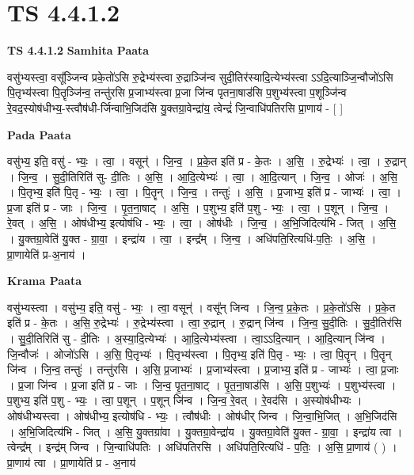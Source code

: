 \documentclass[17pt]{extarticle}
\begin{document}
\section{ TS 4.4.1.2 }

\textbf{TS 4.4.1.2 } \newline
\textbf{Samhita Paata} \newline

वसु॑भ्यस्त्वा॒ वसू᳚ञ्जिन्व प्रके॒तो॑ऽसि रु॒द्रेभ्य॑स्त्वा रु॒द्राञ्जि॑न्व सुदी॒तिर॑स्यादि॒त्येभ्य॑स्त्वा ऽऽदि॒त्याञ्जि॒न्वौजो॑ऽसि पि॒तृभ्य॑स्त्वा पि॒तॄञ्जि॑न्व॒ तन्तु॑रसि प्र॒जाभ्य॑स्त्वा प्र॒जा जि॑न्व पृतना॒षाड॑सि प॒शुभ्य॑स्त्वा प॒शूञ्जि॑न्व रे॒वद॒स्योष॑धीभ्य॒-स्त्वौष॑धी-र्जिन्वाभि॒जिद॑सि यु॒क्तग्रा॒वेन्द्रा॑य॒ त्वेन्द्रं॑ जि॒न्वाधि॑पतिरसि प्रा॒णाय॑ - [  ] \newline

\textbf{Pada Paata} \newline

वसु॑भ्य॒ इति॒ वसु॑ - भ्यः॒ । त्वा॒ । वसून्॑ । जि॒न्व॒ । प्र॒के॒त इति॑ प्र - के॒तः । अ॒सि॒ । रु॒द्रेभ्यः॑ । त्वा॒ । रु॒द्रान् । जि॒न्व॒ । सु॒दी॒तिरिति॑ सु- दी॒तिः । अ॒सि॒ । आ॒दि॒त्येभ्यः॑ । त्वा॒ । आ॒दि॒त्यान् । जि॒न्व॒ । ओजः॑ । अ॒सि॒ । पि॒तृभ्य॒ इति॑ पि॒तृ - भ्यः॒ । त्वा॒ । पि॒तॄन् । जि॒न्व॒ । तन्तुः॑ । अ॒सि॒ । प्र॒जाभ्य॒ इति॑ प्र - जाभ्यः॑ । त्वा॒ । प्र॒जा इति॑ प्र - जाः । जि॒न्व॒ । पृ॒त॒ना॒षाट् । अ॒सि॒ । प॒शुभ्य॒ इति॑ प॒शु - भ्यः॒ । त्वा॒ । प॒शून् । जि॒न्व॒ । रे॒वत् । अ॒सि॒ । ओष॑धीभ्य॒ इत्योष॑धि - भ्यः॒ । त्वा॒ । ओष॑धीः । जि॒न्व॒ । अ॒भि॒जिदित्य॑भि - जित् । अ॒सि॒ । यु॒क्तग्रा॒वेति॑ यु॒क्त - ग्रा॒वा॒ । इन्द्रा॑य । त्वा॒ । इन्द्र᳚म् । जि॒न्व॒ । अधि॑पति॒रित्यधि॑-प॒तिः॒ । अ॒सि॒ । प्रा॒णायेति॑ प्र-अ॒नाय॑ ।  \newline


\textbf{Krama Paata} \newline

वसु॑भ्यस्त्वा । वसु॑भ्य॒ इति॒ वसु॑ - भ्यः॒ । त्वा॒ वसून्॑ । वसू᳚न् जिन्व । जि॒न्व॒ प्र॒के॒तः । प्र॒के॒तो॑ऽसि । प्र॒के॒त इति॑ प्र - के॒तः । अ॒सि॒ रु॒द्रेभ्यः॑ । रु॒द्रेभ्य॑स्त्वा । त्वा॒ रु॒द्रान् । रु॒द्रान् जि॑न्व । जि॒न्व॒ सु॒दी॒तिः । सु॒दी॒तिर॑सि । सु॒दी॒तिरिति॑ सु - दी॒तिः । अ॒स्या॒दि॒त्येभ्यः॑ । आ॒दि॒त्येभ्य॑स्त्वा । त्वा॒ऽऽदि॒त्यान् । आ॒दि॒त्यान् जि॑न्व । जि॒न्वौजः॑ । ओजो॑ऽसि । अ॒सि॒ पि॒तृभ्यः॑ । पि॒तृभ्य॑स्त्वा । पि॒तृभ्य॒ इति॑ पि॒तृ - भ्यः॒ । त्वा॒ पि॒तॄन् । पि॒तॄन् जि॑न्व । जि॒न्व॒ तन्तुः॑ । तन्तु॑रसि । अ॒सि॒ प्र॒जाभ्यः॑ । प्र॒जाभ्य॑स्त्वा । प्र॒जाभ्य॒ इति॑ प्र - जाभ्यः॑ । त्वा॒ प्र॒जाः । प्र॒जा जि॑न्व । प्र॒जा इति॑ प्र - जाः । जि॒न्व॒ पृ॒त॒ना॒षाट् । पृ॒त॒ना॒षाड॑सि । अ॒सि॒ प॒शुभ्यः॑ । प॒शुभ्य॑स्त्वा । प॒शुभ्य॒ इति॑ प॒शु - भ्यः॒ । त्वा॒ प॒शून् । प॒शून् जि॑न्व । जि॒न्व॒ रे॒वत् । रे॒वद॑सि । अ॒स्योष॑धीभ्यः । ओष॑धीभ्यस्त्वा । ओष॑धीभ्य॒ इत्योष॑धि - भ्यः॒ । त्वौष॑धीः । ओष॑धीर् जिन्व । जि॒न्वा॒भि॒जित् । अ॒भि॒जिद॑सि । अ॒भि॒जिदित्य॑भि - जित् । अ॒सि॒ यु॒क्तग्रा॑वा । यु॒क्तग्रा॒वेन्द्रा॑य । यु॒क्तग्रा॒वेति॑ यु॒क्त - ग्रा॒वा॒ । इन्द्रा॑य त्वा । त्वेन्द्र᳚म् । इन्द्र॑म् जिन्व । जि॒न्वाधि॑पतिः । अधि॑पतिरसि । अधि॑पति॒रित्यधि॑ - प॒तिः॒ । अ॒सि॒ प्रा॒णाय॑ ( ) । प्रा॒णाय॑ त्वा । प्रा॒णायेति॑ प्र - अ॒नाय॑ \newline
\end{document}
